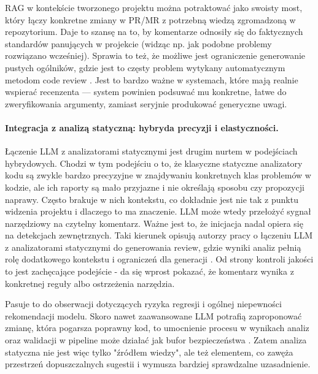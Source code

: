 RAG w kontekście tworzonego projektu można potraktować jako swoisty most, który łączy konkretne zmiany w 
PR/MR z potrzebną wiedzą zgromadzoną w repozytorium. Daje to szansę na to, by komentarze odnosiły się do faktycznych
standardów panujących w projekcie (widząc np. jak podobne problemy rozwiązano wcześniej). Sprawia to też, że możliwe jest
ograniczenie generowanie pustych ogólników, gdzie jest to częsty problem wytykany automatycznym metodom code review \cite{Ren2025HydraReviewer}.
Jest to bardzo ważne w systemach, które mają realnie wspierać recenzenta — system powinien podsuwać mu konkretne, łatwe do 
zweryfikowania argumenty, zamiast seryjnie produkować generyczne uwagi.

\paragraph{Integracja z analizą statyczną: hybryda precyzji i elastyczności.}
Łączenie LLM z analizatorami statycznymi jest drugim nurtem w podejściach hybrydowych. Chodzi w tym podejściu o to,
że klasyczne statyczne analizatory kodu są zwykle bardzo precyzyjne w znajdywaniu konkretnych klas problemów w kodzie,
ale ich raporty są mało przyjazne i nie określają sposobu czy propozycji naprawy. Często brakuje w nich kontekstu, co dokładnie jest nie 
tak z punktu widzenia projektu i dlaczego to ma znaczenie. LLM może wtedy przełożyć sygnał narzędziowy na czytelny komentarz.
Ważne jest to, że inicjacja nadal opiera się na detekcjach zewnętrznych. Taki kierunek opisują autorzy pracy 
o łączeniu LLM z analizatorami statycznymi do generowania review, gdzie wyniki analiz pełnią rolę 
dodatkowego kontekstu i ograniczeń dla generacji \cite{Jaoua2025LLMStaticAnalyzersCR}. Od strony kontroli jakości to jest zachęcające podejście -
da się wprost pokazać, że komentarz wynika z konkretnej reguły albo ostrzeżenia narzędzia.

Pasuje to do obserwacji dotyczących ryzyka regresji i ogólnej niepewności rekomendacji modelu. Skoro nawet zaawansowane LLM
potrafią zaproponować zmianę, która pogarsza poprawny kod, to umocnienie procesu w wynikach analiz oraz walidacji w pipeline może działać
jak bufor bezpieczeństwa \cite{Cihan2025EvaluatingLLMsForCodeReview}. Zatem analiza statyczna nie jest więc tylko "źródłem wiedzy",
ale też elementem, co zawęża przestrzeń dopuszczalnych sugestii i wymusza bardziej sprawdzalne uzasadnienie.

